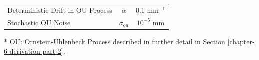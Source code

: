 \begin{table}[!htbp]
\begin{center}
\begin{threeparttable}
\begin{tabular}{lccc}
\multicolumn{2}{l}{Deterministic Drift in OU Process} 
& $\alpha$ & 0.1 mm$^{-1}$ \\

\multicolumn{2}{l}{Stochastic OU Noise} 
& $\sigma_{ou}$ & $10^{-5}$ mm \\

\bottomrule
\end{tabular}

\begin{tablenotes}\footnotesize
\item[*] OU: Ornstein-Uhlenbeck Process \cite{OU} described in further detail in Section \ref{chapter-6-derivation-part-2}.
\end{tablenotes}

\end{threeparttable}
\end{center}

\label{tab:kf-instance-variables-xy}
\end{table}






